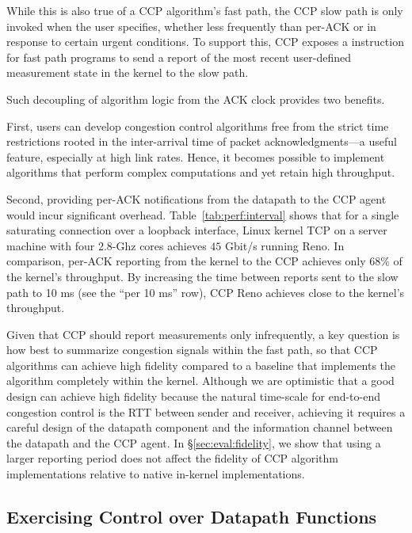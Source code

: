 While this is also true of a CCP algorithm's fast path, the CCP slow path is
only invoked when the user specifies, whether less frequently than per-ACK or in response to certain urgent conditions.
%
To support this, CCP exposes a  instruction for fast path programs to send a
report of the most recent user-defined measurement state in the kernel to the slow path.
\fi

Such decoupling of algorithm logic from the ACK clock provides two benefits.

First, users can develop congestion control algorithms free from the strict
time restrictions rooted in the inter-arrival time of packet acknowledgments---a useful feature, especially at high link rates.
Hence, it becomes possible to implement algorithms that perform complex computations and yet retain high throughput.

Second, providing per-ACK notifications from the datapath to the CCP agent would incur
significant overhead.
%
Table~\ref{tab:perf:interval} shows that for a single saturating 
connection over a loopback interface, Linux kernel TCP on a server machine
with four 2.8-Ghz cores achieves $45$ Gbit/s running Reno.
%
In comparison, per-ACK reporting from the kernel to the CCP \userspace achieves
only 68\% of the kernel's throughput.
%
By increasing the time between reports sent to the slow path to 10 ms (see the
``per 10 ms'' row), CCP Reno achieves close to the kernel's throughput.

Given that CCP should report measurements only infrequently, a key question is
how best to summarize congestion signals within the fast path, so that CCP
algorithms can achieve high fidelity compared to a baseline that implements the
algorithm completely within the kernel.
Although we are optimistic that a good design can achieve high fidelity because the natural time-scale for end-to-end
congestion control is the RTT between sender and receiver,
achieving it requires a careful design of the datapath component and the information channel between the datapath and the CCP agent.
In \S\ref{sec:eval:fidelity}, we show that using a
larger reporting period does not affect the fidelity of CCP algorithm
implementations relative to native in-kernel implementations.


\subsection{Exercising Control over Datapath Functions}
\label{sec:exercising-control-over-datapath}

